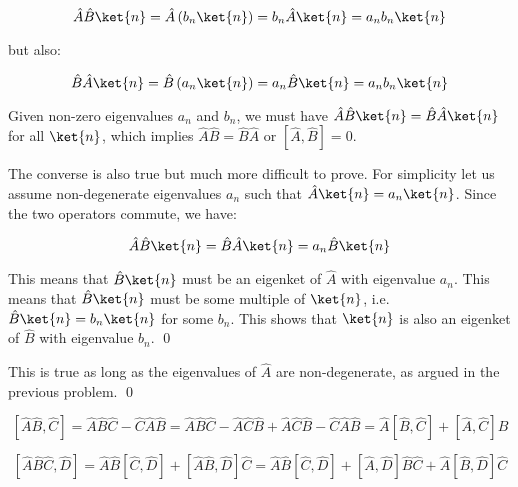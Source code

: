 \documentclass[12pt]{article}
\begin{document}
\begin{equation}
\hat{A} \hat{B} \ket{n} = \hat{A} \left( b_{n} \ket{n} \right) = b_{n} \hat{A} \ket{n} = a_{n} b_{n} \ket{n}
\end{equation}

but also:

\begin{equation}
\hat{B} \hat{A} \ket{n} = \hat{B} \left( a_{n} \ket{n} \right) = a_{n} \hat{B} \ket{n} = a_{n} b_{n} \ket{n}
\end{equation}

Given non-zero eigenvalues $a_{n}$ and $b_{n}$, we must have $\hat{A} \hat{B} \ket{n} = \hat{B} \hat{A} \ket{n}$ for all $\ket{n}$, which implies $\hat{A} \hat{B} = \hat{B} \hat{A}$ or $[\hat{A}, \hat{B}] = 0$.

The converse is also true but much more difficult to prove. For simplicity let us assume non-degenerate eigenvalues $a_{n}$ such that $\hat{A} \ket{n} = a_{n} \ket{n}$. Since the two operators commute, we have:

\begin{equation}
    \hat{A} \hat{B} \ket{n} = \hat{B} \hat{A} \ket{n} = a_{n} \hat{B} \ket{n}
\end{equation}

This means that $\hat{B} \ket{n}$ must be an eigenket of $\hat{A}$ with eigenvalue $a_{n}$. This means that $\hat{B} \ket{n}$ must be some multiple of $\ket{n}$, i.e. $\hat{B} \ket{n} = b_{n} \ket{n}$ for some $b_{n}$. This shows that $\ket{n}$ is also an eigenket of $\hat{B}$ with eigenvalue $b_{n}$.
\qed


This is true as long as the eigenvalues of $\hat{A}$ are non-degenerate, as argued in the previous problem.
\qed




\begin{equation}
    \left[ \hat{A} \hat{B}, \hat{C} \right] = \hat{A} \hat{B} \hat{C} - \hat{C} \hat{A} \hat{B} = \hat{A} \hat{B} \hat{C} - \hat{A} \hat{C} \hat{B} + \hat{A} \hat{C} \hat{B} - \hat{C} \hat{A} \hat{B} = \hat{A} \left[ \hat{B}, \hat{C} \right] + \left[ \hat{A}, \hat{C} \right] \hat{B}
\end{equation}


\begin{equation}
    \left[ \hat{A} \hat{B} \hat{C}, \hat{D} \right] = \hat{A} \hat{B} \left[ \hat{C}, \hat{D} \right] + \left[ \hat{A} \hat{B}, \hat{D} \right] \hat{C} = \hat{A} \hat{B} \left[ \hat{C}, \hat{D} \right] + \left[ \hat{A}, \hat{D} \right] \hat{B} \hat{C} + \hat{A} \left[ \hat{B}, \hat{D} \right] \hat{C}
\end{equation}
\end{document}
